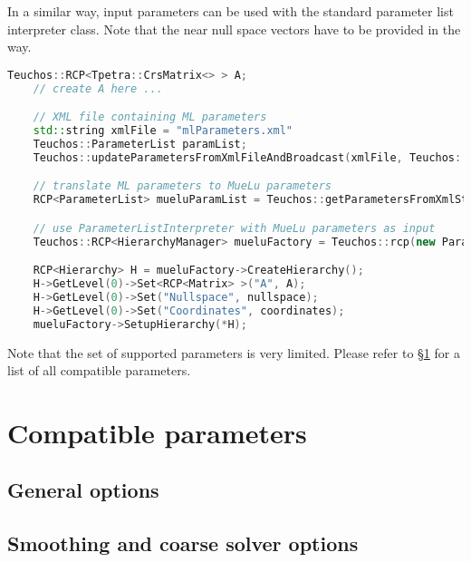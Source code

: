 In a similar way, \ml input parameters can be used with the standard \muelu parameter list interpreter class. Note that the near null space vectors have to be provided in the \muelu way.

\begin{lstlisting}[language=C++]
    Teuchos::RCP<Tpetra::CrsMatrix<> > A;
    // create A here ...

    // XML file containing ML parameters
    std::string xmlFile = "mlParameters.xml"
    Teuchos::ParameterList paramList;
    Teuchos::updateParametersFromXmlFileAndBroadcast(xmlFile, Teuchos::Ptr<Teuchos::ParameterList>(&paramList), *comm);

    // translate ML parameters to MueLu parameters
    RCP<ParameterList> mueluParamList = Teuchos::getParametersFromXmlString(MueLu::ML2MueLuParameterTranslator::translate(paramList,"SA"));

    // use ParameterListInterpreter with MueLu parameters as input
    Teuchos::RCP<HierarchyManager> mueluFactory = Teuchos::rcp(new ParameterListInterpreter(*mueluParamList));

    RCP<Hierarchy> H = mueluFactory->CreateHierarchy();
    H->GetLevel(0)->Set<RCP<Matrix> >("A", A);
    H->GetLevel(0)->Set("Nullspace", nullspace);
    H->GetLevel(0)->Set("Coordinates", coordinates);
    mueluFactory->SetupHierarchy(*H);
\end{lstlisting}

Note that the set of supported \ml parameters is very limited. Please refer to \S\ref{sec:compatiblemlparameters} for a list of all compatible \ml parameters.

\section{Compatible \ml parameters}
\label{sec:compatiblemlparameters}
\subsection{General \ml options}


\subsection{Smoothing and coarse solver options}


